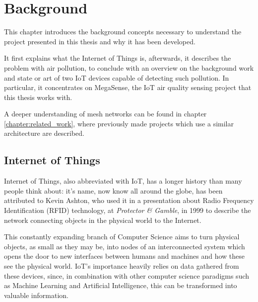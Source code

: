 

\chapter{Background}\label{chap:background}

	This chapter introduces the background concepts necessary to understand the project presented in this thesis and why it has been developed.
	
	It first explains what the Internet of Things is, afterwards, it describes the problem with air pollution, to conclude with an overview on the background work and state or art of two IoT devices capable of detecting such pollution.
	In particular, it concentrates on MegaSense, the IoT air quality sensing project that this thesis works with.

	A deeper understanding of mesh networks can be found in chapter \ref{chapter:related_work}, where previously made projects which use a similar architecture are described.

	\section{Internet of Things}
	
		
		Internet of Things, also abbreviated with IoT, has a longer history than many people think about: it's name, now know all around the globe, has been attributed to Kevin Ashton, who used it in a presentation about Radio Frequency Identification (RFID) technology, at \textit{Protector \& Gamble}, in 1999 \cite{iot_definition} to describe the network connecting objects in the physical world to the Internet.
		
		This constantly expanding branch of Computer Science aims to turn physical objects, as small as they may be, into nodes of an interconnected system which opens the door to new interfaces between humans and machines and how these see the physical world.
		IoT's importance heavily relies on data gathered from these devices, since, in combination with other computer science paradigms such as Machine Learning and Artificial Intelligence, this can be transformed into valuable information.
	
